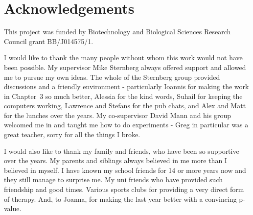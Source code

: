 \chapter*{Acknowledgements}

This project was funded by Biotechnology and Biological Sciences Research Council grant BB/J014575/1.

I would like to thank the many people without whom this work would not have been possible.
My supervisor Mike Sternberg always offered support and allowed me to pursue my own ideas.
The whole of the Sternberg group provided discussions and a friendly environment - particularly Ioannis for making the work in Chapter~3 so much better, Alessia for the kind words, Suhail for keeping the computers working, Lawrence and Stefans for the pub chats, and Alex and Matt for the lunches over the years.
My co-supervisor David Mann and his group welcomed me in and taught me how to do experiments - Greg in particular was a great teacher, sorry for all the things I broke.

I would also like to thank my family and friends, who have been so supportive over the years.
My parents and siblings always believed in me more than I believed in myself.
I have known my school friends for 14 or more years now and they still manage to surprise me.
My uni friends who have provided such friendship and good times.
Various sports clubs for providing a very direct form of therapy.
And, to Joanna, for making the last year better with a convincing p-value.
